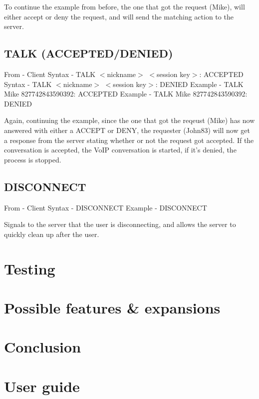 \documentclass[12pt]{rapport}
\begin{document}
\noindent To continue the example from before, the one that got the request (Mike), will either accept or deny the request, and will send the matching action to the server.

\subsection*{TALK (ACCEPTED/DENIED)}
From    - Client\newline
Syntax  - TALK $<$nickname$>$ $<$session key$>$: ACCEPTED\newline
Syntax  - TALK $<$nickname$>$ $<$session key$>$: DENIED\newline
Example - TALK Mike 827742843590392: ACCEPTED\newline
Example - TALK Mike 827742843590392: DENIED\newline

\noindent Again, continuing the example, since the one that got the reqeust (Mike) has now answered with either a ACCEPT or DENY, the requester (John83) will now get a response from the server stating whether or not the request got accepted. If the conversation is accepted, the VoIP conversation is started, if it's denied, the process is stopped.

\subsection*{DISCONNECT}
From    - Client\newline
Syntax  - DISCONNECT\newline
Example - DISCONNECT\newline

\noindent Signals to the server that the user is disconnecting, and allows the server to quickly clean up after the user.


\section*{Testing}



\section*{Possible features \& expansions}



\newpage
\section*{Conclusion}




\newpage
\section*{User guide}
\end{document}
